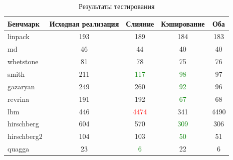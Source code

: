 \begin{table}[ht]
\begin{tabular}{l | c | c | c | c }
Бенчмарк & Исходная реализация & Слияние & Кэширование & Оба \\
\hline \hline
linpack     & 193 & 189                    & 184                    & 183 \\
md          & 46  & 44                     & 40                     & 40\\ 
whetstone   & 81  & 78                     & 75                     & 76\\
smith       & 211 & \textcolor{green}{117} & \textcolor{green}{98}  & 97\\
gazaryan    & 249 & 260                    & \textcolor{green}{92}  & 96\\
revrina     & 191 & 192                    & \textcolor{green}{67}  & 68\\
lbm         & 446 & \textcolor{red}{4474}  & 341                    & 4490\\
hirschberg  & 604 & 570                    & \textcolor{green}{309} & 306\\
hirschberg2 & 104 & 103                    & \textcolor{green}{50}  & 51\\
quagga      & 23  & \textcolor{green}{6}   & 22                     & 6
\end{tabular}
\caption{Результаты тестирования}
\label{tabl:Profiling}
\end{table}

\newpage %

\printbibliography[
    heading=bibintoc%
    ,title=Библиография %
]


